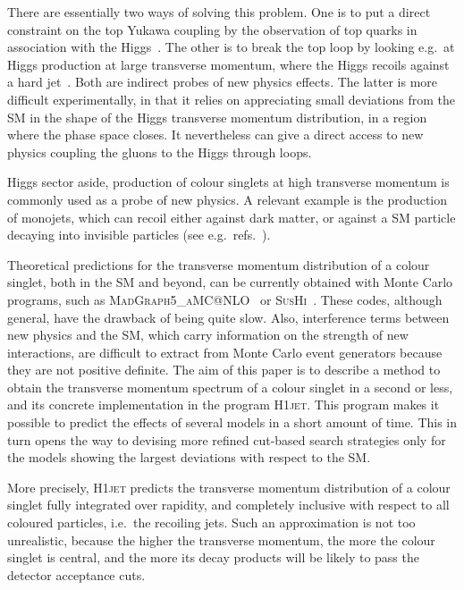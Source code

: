 \documentclass[12pt]{article}
\begin{document}
There are essentially two ways of solving this problem. One is to put
a direct constraint on the top Yukawa coupling by the
observation of top quarks in association with the
Higgs~\cite{Aad:2020ivc,Sirunyan:2020sum,Maltoni:2016yxb}. The other is
to break the top loop by looking e.g.\ at Higgs production at large
transverse momentum, where the Higgs recoils against a hard
jet~\cite{Azatov:2013xha,Grojean:2013nya,Banfi:2013yoa}. Both are
indirect probes of new physics effects. The latter is more difficult
experimentally, in that it relies on appreciating small deviations from
the SM in the shape of the Higgs transverse momentum distribution, in
a region where the phase space closes. It nevertheless can give a
direct access to new physics coupling the gluons to the Higgs through loops.

Higgs sector aside, production of colour singlets at high transverse
momentum is commonly used as a probe of new physics. A relevant
example is the production of monojets, which can recoil
either against dark matter, or against a SM particle decaying into
invisible particles (see e.g.\ refs.~\cite{Sirunyan:2017hci,Aaboud:2019yqu}).

Theoretical predictions for the transverse momentum distribution of a
colour singlet, both in the SM and beyond, can be currently obtained
with Monte Carlo programs, such as
\textsc{\linebreak MadGraph5\_aMC@NLO}~\cite{Alwall:2014hca} or
\textsc{SusHi}~\cite{Harlander:2012pb,Harlander:2016hcx}. These codes,
although general, have the drawback of being quite slow. Also,
interference terms between new physics and the SM, which
carry information on the strength of new interactions, are difficult
to extract from Monte Carlo event generators because they are not positive
definite. The aim of this paper is to describe a method to obtain the
transverse momentum spectrum of a colour singlet in a second or less,
and its concrete implementation in the program \textsc{H1jet}. This program
makes it possible to predict the effects of several models in a short
amount of time. This in turn opens the way to devising more refined
cut-based search strategies only for the models showing the largest
deviations with respect to the SM.

More precisely, \textsc{H1jet} predicts the transverse momentum distribution of
a colour singlet fully integrated over rapidity, and completely
inclusive with respect to all coloured particles, i.e.\ the recoiling
jets. Such an approximation is not too unrealistic, because the higher the
transverse momentum, the more the colour singlet is central, and the
more its decay products will be likely to pass the detector acceptance
cuts.
\end{document}
